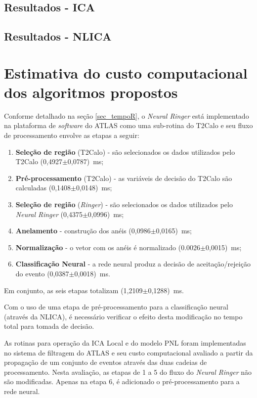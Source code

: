 \subsection{Resultados - ICA}

\subsection{Resultados - NLICA}

\section{Estimativa do custo computacional dos algoritmos
propostos}

Conforme detalhado na seção \ref{sec_tempoR}, o \textit{Neural
Ringer} está implementado na plataforma de \textit{software} do
ATLAS como uma sub-rotina do T2Calo e seu fluxo de processamento
envolve as etapas a seguir:
\begin{enumerate}
    \item \textbf{Seleção de região} (T2Calo) - são selecionados os
    dados utilizados pelo T2Calo (0,4927$\pm$0,0787)~ms;
    \item \textbf{Pré-processamento} (T2Calo) - as variáveis de decisão do
    T2Calo são calculadas (0,1408$\pm$0,0148)~ms;
    \item \textbf{Seleção de região} (\emph{Ringer})  - são selecionados os
    dados utilizados pelo \textit{Neural Ringer} (0,4375$\pm$0,0996)~ms;
    \item \textbf{Anelamento} - construção dos anéis (0,0986$\pm$0,0165)~ms;
    \item \textbf{Normalização} - o vetor com os anéis é normalizado (0.0026$\pm$0,0015)~ms;
    \item \textbf{Classificação Neural} - a rede neural produz a decisão
    de aceitação/rejeição do evento (0,0387$\pm$0,0018)~ms.
\end{enumerate}
Em conjunto, as seis etapas totalizam (1,2109$\pm$0,1288)~ms.

Com o uso de uma etapa de pré-processamento para a classificação
neural (através da NLICA), é necessário verificar o efeito desta
modificação no tempo total para tomada de decisão.

As rotinas para operação da ICA Local e do modelo PNL foram
implementadas no sistema de filtragem do ATLAS e seu custo
computacional avaliado a partir da propagação de um conjunto de
eventos através das duas cadeias de processamento. Nesta
avaliação, as etapas de 1 a 5 do fluxo do \textit{Neural Ringer}
não são modificadas. Apenas na etapa 6, é adicionado o
pré-processamento para a rede neural.

